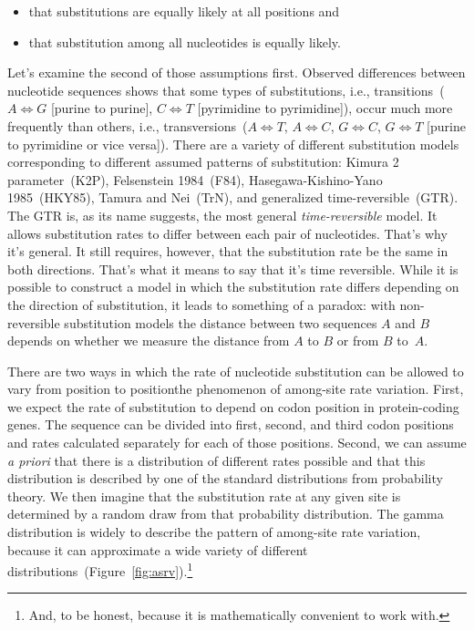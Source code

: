\documentclass[12pt]{article}
\begin{document}
\begin{itemize}

\item that substitutions are equally likely at all positions and

\item that substitution among all nucleotides is equally likely.

\end{itemize}

Let's examine the second of those assumptions first. Observed
differences between nucleotide sequences shows that some types of
substitutions, i.e., transitions~($A \iff G$ [purine to purine], $C
\iff T$ [pyrimidine to pyrimidine]), occur much more frequently than
others, i.e., transversions~($A \iff T$, $A \iff C$, $G \iff C$, $G
\iff T$ [purine to pyrimidine or vice versa]). There are a variety of
different substitution models corresponding to different assumed
patterns of substitution: Kimura 2 parameter~(K2P), Felsenstein
1984~(F84), Hasegawa-Kishino-Yano 1985~(HKY85), Tamura and Nei~(TrN),
and generalized time-reversible~(GTR). The GTR is, as its name
suggests, the most general {\it time-reversible\/} model. It allows
substitution rates to differ between each pair of nucleotides. That's
why it's general. It still requires, however, that the substitution
rate be the same in both directions. That's what it means to say that
it's time reversible. While it is possible to construct a model in
which the substitution rate differs depending on the direction of
substitution, it leads to something of a paradox: with non-reversible
substitution models the distance between two sequences $A$ and $B$
depends on whether we measure the distance from $A$ to $B$ or from $B$
to~$A$.

There are two ways in which the rate of nucleotide substitution can be
allowed to vary from position to position{\dash}the phenomenon of
among-site rate variation. First, we expect the rate of substitution
to depend on codon position in protein-coding genes. The sequence can
be divided into first, second, and third codon positions and rates
calculated separately for each of those positions. Second, we can
assume {\it a priori\/} that there is a distribution of different
rates possible and that this distribution is described by one of the
standard distributions from probability theory. We then imagine that
the substitution rate at any given site is determined by a random draw
from that probability distribution. The gamma distribution is widely
to describe the pattern of among-site rate variation, because it can
approximate a wide variety of different
distributions~(Figure~\ref{fig:asrv}).\footnote{And, to be honest,
  because it is mathematically convenient to work
  with.}
\end{document}
